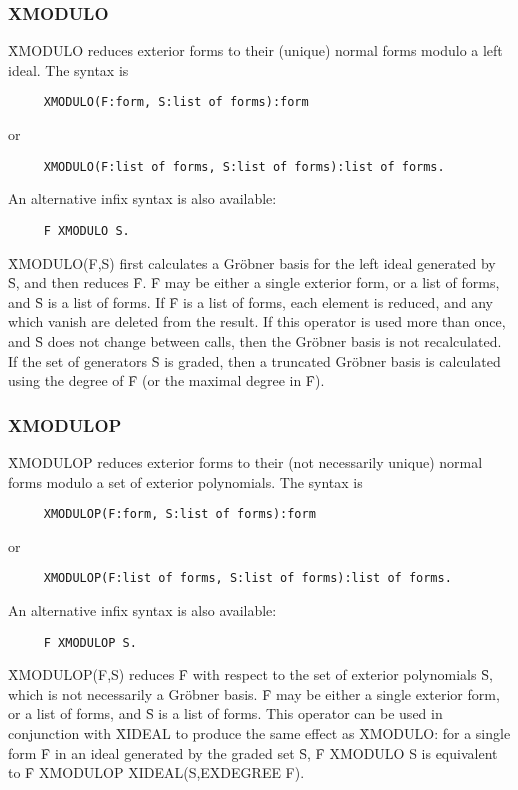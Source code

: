 \subsubsection*{XMODULO}

\f{XMODULO} reduces exterior forms to their (unique) normal forms modulo a
left ideal. The syntax is
\begin{verbatim}
     XMODULO(F:form, S:list of forms):form
\end{verbatim}
or
\begin{verbatim}
     XMODULO(F:list of forms, S:list of forms):list of forms.
\end{verbatim}
An alternative infix syntax is also available:
\begin{verbatim}
     F XMODULO S.
\end{verbatim}
\f{XMODULO(F,S)} first calculates a Gr\"obner basis for the left ideal
generated by \f{S}, and then reduces \f{F}. \f{F} may be either a single
exterior form, or a list of forms, and \f{S} is a list of forms. If \f{F}
is a list of forms, each element is reduced, and any which vanish are
deleted from the result.  If this operator is used more than once, and
\f{S} does not change between calls, then the Gr\"obner basis is not
recalculated. If the set of generators \f{S} is graded, then a truncated
Gr\"obner basis is calculated using the degree of \f{F} (or the maximal
degree in \f{F}).

\subsubsection*{XMODULOP}

\f{XMODULOP} reduces exterior forms to their (not necessarily unique)
normal forms modulo a set of exterior polynomials. The syntax is
\begin{verbatim}
     XMODULOP(F:form, S:list of forms):form
\end{verbatim}
or
\begin{verbatim}
     XMODULOP(F:list of forms, S:list of forms):list of forms.
\end{verbatim}
An alternative infix syntax is also available:
\begin{verbatim}
     F XMODULOP S.
\end{verbatim}
\f{XMODULOP(F,S)} reduces \f{F} with respect to the set of exterior
polynomials \f{S}, which is not necessarily a Gr\"obner basis. \f{F} may be
either a single exterior form, or a list of forms, and \f{S} is a list of
forms. This operator can be used in conjunction with \f{XIDEAL} to produce
the same effect as \f{XMODULO}: for a single form \f{F} in an ideal
generated by the graded set \f{S}, \f{F XMODULO S} is equivalent to \f{F
XMODULOP XIDEAL(S,EXDEGREE F)}.

